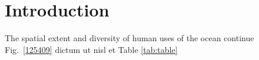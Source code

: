 \section{Introduction}
\label{introduction}

The spatial extent and diversity of human uses of the ocean continue Fig.~\ref{125409} dictum ut nisl et Table \ref{tab:table}
